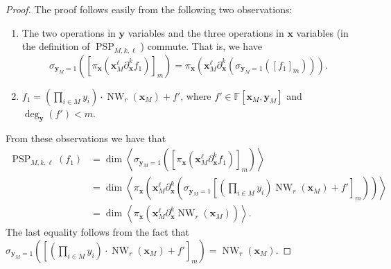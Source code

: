 \documentclass[10pt,a4paper]{article}
\DeclareMathOperator{\PSP}{PSP}
\begin{document}
\begin{proof}
The proof follows easily from the following two observations:
\begin{enumerate}
\item The two operations in $\mathbf y$ variables and the three operations in $\mathbf x$ variables (in the definition of $\PSP_{M,k,\ell}$) commute. That is, we have
\[
\sigma_{\mathbf y_M=1}([\pi_{\mathbf x}(\mathbf x_M^\ell\partial_{\mathbf x}^kf_1)]_m)
=\pi_{\mathbf x}(\mathbf x_M^\ell\partial_{\mathbf x}^k(\sigma_{\mathbf y_M=1}([f_1]_m))).
\]
\item $f_1=(\prod_{i\in M}y_i)\cdot\operatorname{NW}_r(\mathbf x_M)+f'$, where $f'\in\mathbb F[\mathbf x_M,\mathbf y_M]$ and $\deg_{\mathbf y}(f')<m$.
\end{enumerate}
From these observations we have that
\begin{align*}
\PSP_{M,k,\ell}(f_1)
&=\dim\left\langle\sigma_{\mathbf y_M=1}([\pi_{\mathbf x}(\mathbf x_M^\ell\partial_{\mathbf x}^kf_1)]_m)\right\rangle\\
&=\dim\left\langle\pi_{\mathbf x}\left(\mathbf x_M^\ell\partial_{\mathbf x}^k
\left(\sigma_{\mathbf y_M=1}\left[\left(\prod_{i\in M}y_i\right)\operatorname{NW}_r(\mathbf x_M)+f'\right]_m\right)\right)\right\rangle\\
&=\dim\left\langle\pi_{\mathbf x}(\mathbf x_M^\ell\partial_{\mathbf x}^k\operatorname{NW}_r(\mathbf x_M))\right\rangle.
\end{align*}
The last equality follows from the fact that
$\sigma_{\mathbf y_M=1}([(\prod_{i\in M}y_i)\cdot\operatorname{NW}_r(\mathbf x_M)+f']_m)=\operatorname{NW}_r(\mathbf x_M)$.
\end{proof}
\end{document}
